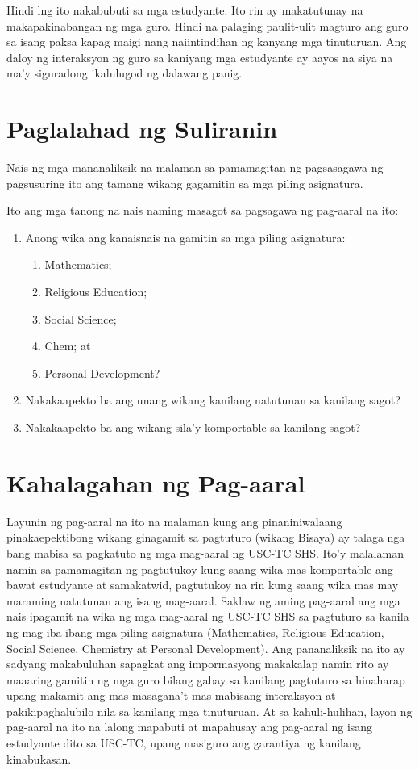 \documentclass [11pt] {report}
\begin{document}
Hindi lng ito nakabubuti sa mga estudyante. Ito rin ay makatutunay na
makapakinabangan ng mga guro. Hindi na palaging paulit-ulit magturo ang guro sa
isang paksa kapag maigi nang naiintindihan ng kanyang mga tinuturuan. Ang daloy
ng interaksyon ng guro sa kaniyang mga estudyante ay aayos na siya na ma’y
siguradong ikalulugod ng dalawang panig.

\pagebreak
\section {Paglalahad ng Suliranin}
Nais ng mga mananaliksik na malaman sa pamamagitan ng pagsasagawa ng pagsusuring
ito ang tamang wikang gagamitin sa mga piling asignatura.

Ito ang mga tanong na nais naming masagot sa pagsagawa ng pag-aaral na ito:

\begin{enumerate}[parsep=\baselineskip,itemsep=-0.5\baselineskip]
\item Anong wika ang kanaisnais na gamitin sa mga piling asignatura:
  \begin{enumerate}[nosep]
  \item Mathematics;
  \item Religious Education;
  \item Social Science;
  \item Chem; at
  \item Personal Development?
  \end{enumerate}
\item Nakakaapekto ba ang unang wikang kanilang natutunan sa kanilang sagot?
\item Nakakaapekto ba ang wikang sila'y komportable sa kanilang sagot?
\end{enumerate}

\section{Kahalagahan ng Pag-aaral}
Layunin ng pag-aaral na ito na malaman kung ang pinaniniwalaang pinakaepektibong
wikang ginagamit sa pagtuturo (wikang Bisaya) ay talaga nga bang mabisa sa
pagkatuto ng mga mag-aaral ng USC-TC SHS. Ito’y malalaman namin sa pamamagitan
ng pagtutukoy kung saang wika mas komportable ang bawat estudyante at
samakatwid, pagtutukoy na rin kung saang wika mas may maraming natutunan ang
isang mag-aaral. Saklaw ng aming pag-aaral ang mga nais ipagamit na wika ng mga
mag-aaral ng USC-TC SHS sa pagtuturo sa kanila ng mag-iba-ibang mga piling
asignatura (Mathematics, Religious Education, Social Science, Chemistry at
Personal Development). Ang pananaliksik na ito ay sadyang makabuluhan sapagkat
ang impormasyong makakalap namin rito ay maaaring gamitin ng mga guro bilang
gabay sa kanilang pagtuturo sa hinaharap upang makamit ang mas masagana’t mas
mabisang interaksyon at pakikipaghalubilo nila sa kanilang mga tinuturuan. At sa
kahuli-hulihan, layon ng pag-aaral na ito na lalong mapabuti at mapahusay ang
pag-aaral ng isang estudyante dito sa USC-TC, upang masiguro ang garantiya ng
kanilang kinabukasan.
\end{document}
